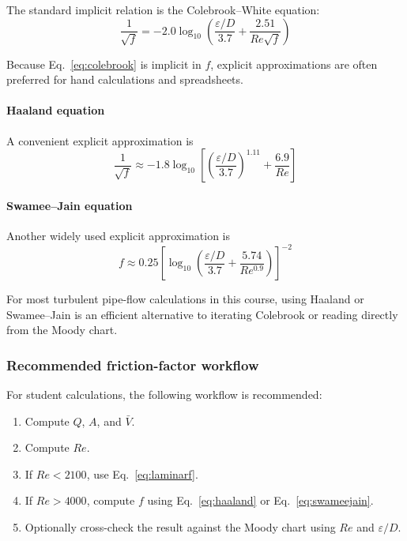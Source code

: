 The standard implicit relation is the Colebrook--White equation:
\begin{equation}
\frac{1}{\sqrt{f}}
=
-2.0\log_{10}
\left(
\frac{\varepsilon/D}{3.7}
+
\frac{2.51}{Re\sqrt{f}}
\right)
\label{eq:colebrook}
\end{equation}

Because Eq.~\eqref{eq:colebrook} is implicit in \(f\), explicit approximations are often preferred for hand calculations and spreadsheets.

\paragraph{Haaland equation}
A convenient explicit approximation is
\begin{equation}
\frac{1}{\sqrt{f}}
\approx
-1.8\log_{10}
\left[
\left(
\frac{\varepsilon/D}{3.7}
\right)^{1.11}
+
\frac{6.9}{Re}
\right]
\label{eq:haaland}
\end{equation}

\paragraph{Swamee--Jain equation}
Another widely used explicit approximation is
\begin{equation}
f
\approx
0.25
\left[
\log_{10}
\left(
\frac{\varepsilon/D}{3.7}
+
\frac{5.74}{Re^{0.9}}
\right)
\right]^{-2}
\label{eq:swameejain}
\end{equation}

For most turbulent pipe-flow calculations in this course, using Haaland or Swamee--Jain is an efficient alternative to iterating Colebrook or reading directly from the Moody chart.

\subsubsection*{Recommended friction-factor workflow}
For student calculations, the following workflow is recommended:
\begin{enumerate}[leftmargin=*]
    \item Compute \(Q\), \(A\), and \(\bar{V}\).
    \item Compute \(Re\).
    \item If \(Re < 2100\), use Eq.~\eqref{eq:laminarf}.
    \item If \(Re > 4000\), compute \(f\) using Eq.~\eqref{eq:haaland} or Eq.~\eqref{eq:swameejain}.
    \item Optionally cross-check the result against the Moody chart using \(Re\) and \(\varepsilon/D\).
\end{enumerate}

